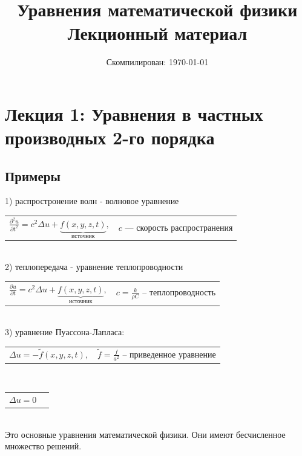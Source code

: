 \documentclass{article}
\title{Уравнения математической физики\\Лекционный материал}
\author{}
\date{Скомпилирован: \today}
\begin{document}
\maketitle

\newpage

\section{Лекция 1: Уравнения в частных производных 2-го порядка}

\subsection{Примеры}

1) распростронение волн - волновое уравнение \par\medskip
\begin{tabular}{p{} p{}}
  \hspace{1cm}\(\displaystyle 
    \frac{\partial^2 u}{\partial t^2} = c^2 \Delta u + \underbrace{f(x, y, z, t)}_{\text{источник}},
  \) &
  \(c\) — скорость распространения
\end{tabular}  \bigskip\\
2) теплопередача - уравнение теплопроводности \par\medskip
\begin{tabular}{p{} p{}}
  \hspace{1cm}\(\displaystyle 
    \frac{\partial u}{\partial t} = c^2 \Delta u + \underbrace{f(x, y, z, t)}_{\text{источник}} ,
  \) &
  $c=\frac{k}{\rho C}$ -- теплопроводность
\end{tabular} \bigskip\\
3) уравнение Пуассона-Лапласа:\par\medskip
\begin{tabular}{p{} p{}}
  \hspace{1cm}\(\displaystyle 
    \Delta u = -\tilde f(x, y, z, t) ,
  \) &
  $\tilde f=\frac{f}{a^2}$ -- приведенное уравнение
\end{tabular} \\
\begin{tabular}{p{} p{}}
  \hspace{1cm}\(\displaystyle 
    \Delta u = 0
  \) &
\end{tabular} \\

Это основные уравнения математической физики. Они имеют бесчисленное множество решений.
\end{document}
